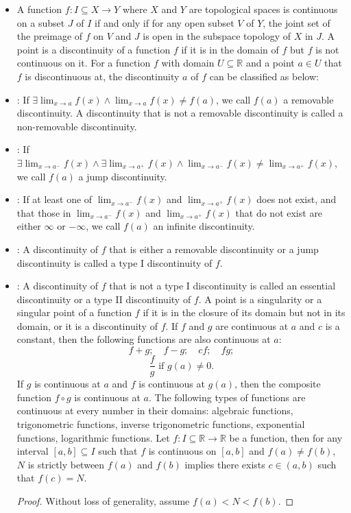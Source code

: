 \documentclass[a4paper,12pt]{report}
\begin{document}
\begin{itemize}
\begin{itemize}
\item A function $f\colon I\subseteq X\to Y$ where $X$ and $Y$ are topological spaces is continuous on a subset $J$ of $I$ if and only if for any open subset $V$ of $Y$, the joint set of the preimage of $f$ on $V$ and $J$ is open in the subspace topology of $X$ in $J$.
\eit
{}
A point is a discontinuity of a function $f$ if it is in the domain of $f$ but $f$ is not continuous on it.
For a function $f$ with domain $U\subseteq\mathbb{R}$ and a point $a\in U$ that $f$ is discontinuous at, the discontinuity $a$ of $f$ can be classified as below:
\bit
\item {}: If $\exists\lim_{x\to a}f(x)\land\lim_{x\to a}f(x)\neq f(a)$, we call $f(a)$ a removable discontinuity. A discontinuity that is not a removable discontinuity is called a non-removable discontinuity.
\item {}: If $\exists\lim_{x\to a^-}f(x)\land\exists\lim_{x\to a^+}f(x)\land\lim_{x\to a^-}f(x)\neq\lim_{x\to a^+}f(x)$, we call $f(a)$ a jump discontinuity.
\item{}: If at least one of $\lim_{x\to a^-}f(x)$ and $\lim_{x\to a^+}f(x)$ does not exist, and that those in $\lim_{x\to a^-}f(x)$ and $\lim_{x\to a^+}f(x)$ that do not exist are either $\infty$ or $-\infty$, we call $f(a)$ an infinite discontinuity.
\item{}: A discontinuity of $f$ that is either a removable discontinuity or a jump discontinuity is called a type I discontinuity of $f$.
\item{}: A discontinuity of $f$ that is not a type I discontinuity is called an essential discontinuity or a type II discontinuity of $f$.
\eit
{}
A point is a singularity or a singular point of a function $f$ if it is in the closure of its domain but not in its domain, or it is a discontinuity of $f$.
If $f$ and $g$ are continuous at $a$ and $c$ is a constant, then the following functions are also continuous at $a$:
\[f+g;\quad f-g;\quad cf;\quad fg;\]
\[\frac{f}{g}\text{\ if\ }g(a)\neq 0.\]
If $g$ is continuous at $a$ and $f$ is continuous at $g(a)$, then the composite function $f\circ g$ is continuous at $a$.
The following types of functions are continuous at every number in their domains: algebraic functions, trigonometric functions, inverse trigonometric functions, exponential functions, logarithmic functions.
Let $f\colon I\subseteq\mathbb{R}\to\mathbb{R}$ be a function, then for any interval $[a,b]\subseteq I$ such that $f$ is continuous on $[a,b]$ and $f(a)\neq f(b)$, $N$ is strictly between $f(a)$ and $f(b)$ implies there exists $c\in (a,b)$ such that $f(c)=N$.
\begin{proof}
Without loss of generality, assume $f(a)<N<f(b)$.


\end{proof}
\end{itemize}
\end{itemize}
\end{document}
